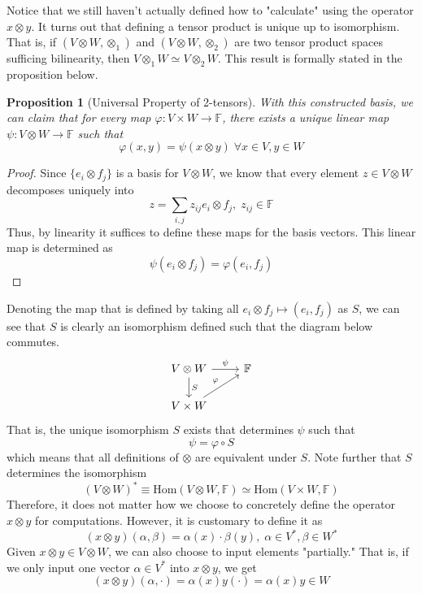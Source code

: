 \documentclass{article}
\newtheorem{proposition}[theorem]{Proposition}
\theoremstyle{remark}
\theoremstyle{definition}
\begin{document}
    Notice that we still haven't actually defined how to "calculate" using the operator $x \otimes y$. It turns out that defining a tensor product is unique up to isomorphism. That is, if $(V \otimes W, \otimes_1)$ and $(V \otimes W, \otimes_2)$ are two tensor product spaces sufficing bilinearity, then $V \otimes_1 W \simeq V \otimes_2 W$. This result is formally stated in the proposition below. 

    \begin{proposition}[Universal Property of 2-tensors]
    With this constructed basis, we can claim that for every map $\varphi: V \times W \longrightarrow \mathbb{F}$, there exists a unique linear map $\psi: V \otimes W \longrightarrow \mathbb{F}$ such that 
    \[\varphi (x, y) = \psi (x \otimes y) \; \forall x \in V, y \in W\]
    \end{proposition}
    \begin{proof}
    Since $\{e_i \otimes f_j\}$ is a basis for $V \otimes W$, we know that every element $z \in V \otimes W$ decomposes uniquely into 
    \[z = \sum_{i, j} z_{i j} e_i \otimes f_j, \; z_{i j} \in \mathbb{F}\]
    Thus, by linearity it suffices to define these maps for the basis vectors. This linear map is determined as 
    \[\psi (e_i \otimes f_j) = \varphi (e_i, f_j)\]
    \end{proof}
    Denoting the map that is defined by taking all $e_i \otimes f_j \mapsto (e_i, f_j)$ as $S$, we can see that $S$ is clearly an isomorphism defined such that the diagram below commutes. 
    \[\begin{tikzcd}
        V \otimes W \arrow{r}{\psi} \arrow{d}{S} & \mathbb{F} \\
        V \times W \arrow{ru}{\varphi}
    \end{tikzcd}\]
    That is, the unique isomorphism $S$ exists that determines $\psi$ such that 
    \[\psi = \varphi \circ S \] 
    which means that all definitions of $\otimes$ are equivalent under $S$. Note further that $S$ determines the isomorphism 
    \[(V \otimes W)^* \equiv \text{Hom}(V \otimes W, \mathbb{F}) \simeq \text{Hom}(V \times W, \mathbb{F})\]
    Therefore, it does not matter how we choose to concretely define the operator $x \otimes y$ for computations. However, it is customary to define it as
    \[(x \otimes y) (\alpha, \beta) = \alpha (x) \cdot \beta (y), \; \alpha \in V^*, \beta \in W^*\]
    Given $x \otimes y \in V \otimes W$, we can also choose to input elements "partially." That is, if we only input one vector $\alpha \in V^*$ into $x \otimes y$, we get
    \[(x \otimes y) (\alpha, \cdot) = \alpha(x) y (\cdot) = \alpha (x) y \in W\]
\end{document}
